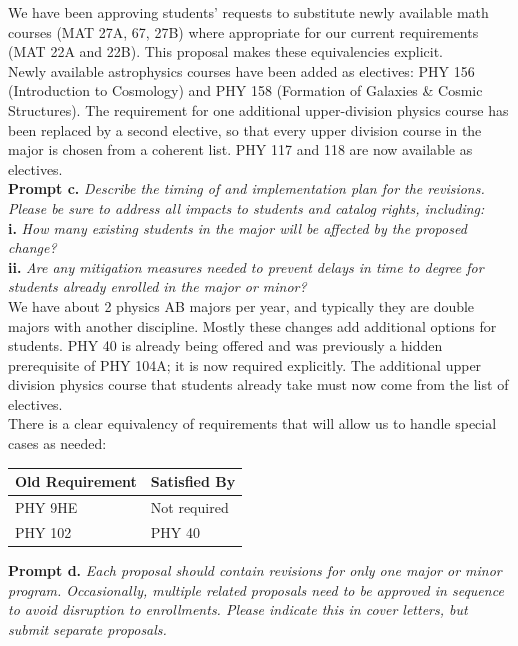 \documentclass[12pt]{article}
\begin{document}
\noindent
We have been approving students' requests to substitute newly available
math courses (MAT 27A, 67, 27B) where appropriate for our current
requirements (MAT 22A and 22B).  This proposal makes these
equivalencies explicit.\\[5pt]

\noindent
Newly available astrophysics courses have been added as electives: PHY
156 (Introduction to Cosmology) and PHY 158 (Formation of Galaxies \& Cosmic Structures).  The
requirement for one additional upper-division physics course has
been replaced by a second elective, so that every upper division
course in the major is chosen from a coherent list.  PHY 117 and 118
are now available as electives.\\[5pt]

\noindent
{\bf Prompt c.} {\it Describe the timing of and implementation plan for the revisions. Please be sure to address all impacts to students and catalog rights, including:}\\
{\bf i.} {\it How many existing students in the major will be affected by the proposed change?}\\
{\bf ii.} {\it Are any mitigation measures needed to prevent delays in time to degree for students already enrolled in the major or minor?}\\

\noindent
We have about 2 physics AB majors per year, and typically they are double majors with another
discipline.  Mostly these changes add additional options for students.  PHY 40 is already being offered and was previously a hidden prerequisite of PHY 104A; it is
now required explicitly.  The additional upper division physics course that students already take
must now come from the list of electives.\\[5pt]

\noindent
There is a clear equivalency of requirements that will allow us to
handle special cases as needed:
\begin{center}
\begin{tabular}{ll}
Old Requirement & Satisfied By \\
\hline
PHY 9HE & Not required \\
PHY 102 & PHY 40 \\
\end{tabular}
\end{center}

\noindent
{\bf Prompt d.} {\it Each proposal should contain revisions for only
  one major or minor program. Occasionally, multiple related proposals
  need to be approved in sequence to avoid disruption to
  enrollments. Please indicate this in cover letters, but submit
  separate proposals.}\\
\end{document}

